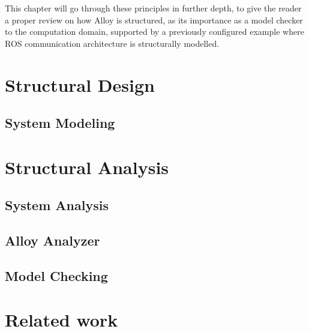 This chapter will go through these principles in further depth, to give the reader a proper review on how Alloy is structured, as its importance as a model checker to the computation domain, supported by a previously configured example where ROS communication architecture is structurally modelled.

\section{Structural Design}

\subsection{System Modeling}

\section{Structural Analysis}

\subsection{System Analysis}

\subsection{Alloy Analyzer}

\subsection{Model Checking}

\section{Related work}\label{s:alloy-relWork}
